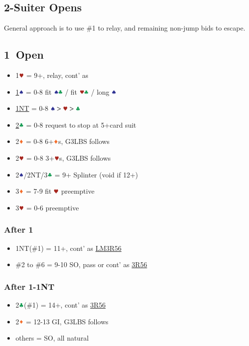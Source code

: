 \documentclass{article}
\begin{document}
\begin{multicols}{2}
\begin{CJK*}{UTF8}{gt}
\section{2-Suiter Opens}
General approach is to use \#1 to relay, and remaining non-jump bids to escape.

\subsection{1\DDD\ Open}\label{sec:1d}
\begin{itemize}
    \item 1$\hhh$ = 9+, relay, cont' as 
    \item \hyperref[sec:1d-escape]{1$\sss$} = 0-8 fit $\sss\ccc$ / fit $\hhh\ccc$ / long $\sss$
    \item \hyperref[sec:1d-escape]{1NT} = 0-8 $\sss>\hhh>\ccc$
    \item \hyperref[sec:1d-escape]{2$\ccc$} = 0-8 request to stop at 5+card suit
    \item 2$\ddd$ = 0-8 6+$\ddd$s, G3LBS follows
    \item 2$\hhh$ = 0-8 3+$\hhh$s, G3LBS follows
    \item 2$\sss$/2NT/3$\ccc$ = 9+ Splinter (void if 12+)
    \item 3$\ddd$ = 7-9 fit $\hhh$ preemptive
    \item 3$\hhh$ = 0-6 preemptive
\end{itemize}

\subsubsection{After 1\SSS}
\begin{itemize}
    \item 1NT(\#1) = 11+, cont' as \hyperref[sec:nlm3r56]{LM3R56}
    \item \#2 to \#6 = 9-10 SO, pass or cont' as \hyperref[sec:nlm3r56]{3R56}
\end{itemize}

\subsubsection{After 1\HHH-1NT}
\begin{itemize}
    \item 2$\ccc$(\#1) = 14+, cont' as \hyperref[sec:nlm3r56]{3R56}
    \item 2$\ddd$ = 12-13 GI, G3LBS follows
    \item others = SO, all natural
\end{itemize}


\end{CJK*}
\end{multicols}
\end{document}
